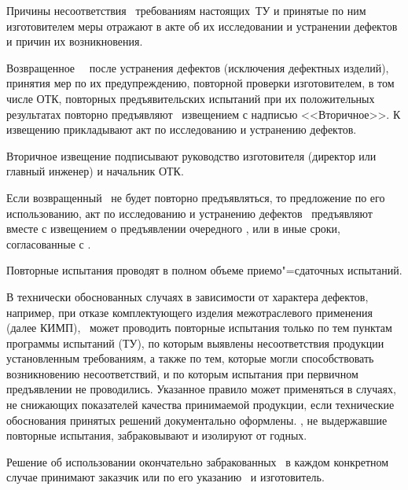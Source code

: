 Причины несоответствия \dut \ требованиям настоящих~ТУ и принятые по ним изготовителем меры отражают в акте об их исследовании и устранении дефектов и причин их возникновения.

\point
\label{prg}
Возвращенное \client \  \dut \   после устранения дефектов (исключения дефектных изделий), принятия мер по их предупреждению, повторной проверки изготовителем, в том числе ОТК, повторных предъявительских испытаний при их положительных результатах повторно предъявляют \client \ извещением с надписью <<Вторичное>>. К извещению прикладывают акт по исследованию и устранению дефектов.

Вторичное извещение подписывают руководство изготовителя (директор или главный инженер) и начальник ОТК.

Если возвращенный \dut \ не будет повторно предъявляться, то предложение по его использованию, акт по исследованию и устранению дефектов \client \ предъявляют вместе с извещением о предъявлении очередного \dut, или в иные сроки, согласованные с \client.

\point
Повторные испытания проводят в полном объеме приемо"=сдаточных испытаний. 

В технически обоснованных случаях в зависимости от характера дефектов, например, при отказе комплектующего изделия межотраслевого применения (далее КИМП), \client \ может проводить повторные испытания только по тем пунктам программы испытаний (ТУ), по которым выявлены несоответствия продукции установленным требованиям, а также по тем, которые могли способствовать возникновению несоответствий, и по которым испытания при первичном предъявлении не проводились. Указанное правило может применяться в случаях, не снижающих показателей качества принимаемой продукции, если технические обоснования принятых решений документально оформлены. \dut, не выдержавшие повторные испытания, забраковывают и изолируют от годных.

\point
\label{prg1}
Решение об использовании окончательно забракованных \dut \ в каждом конкретном случае принимают заказчик или по его указанию \client \ и изготовитель.